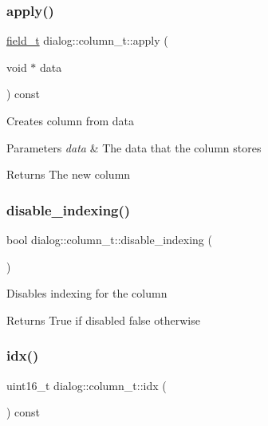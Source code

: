 \subsubsection{\texorpdfstring{apply()}{apply()}}
{\footnotesize\ttfamily \hyperlink{structdialog_1_1field__t}{field\+\_\+t} dialog\+::column\+\_\+t\+::apply (\begin{DoxyParamCaption}\item[{void $\ast$}]{data }\end{DoxyParamCaption}) const\hspace{0.3cm}{\ttfamily [inline]}}

Creates column from data 
\begin{DoxyParams}{Parameters}
{\em data} & The data that the column stores \\
\hline
\end{DoxyParams}
\begin{DoxyReturn}{Returns}
The new column 
\end{DoxyReturn}
\mbox{\label{classdialog_1_1column__t_ad9c14144d0ca7ae53f84f9c7fe222db9}} 
\subsubsection{\texorpdfstring{disable\+\_\+indexing()}{disable\_indexing()}}
{\footnotesize\ttfamily bool dialog\+::column\+\_\+t\+::disable\+\_\+indexing (\begin{DoxyParamCaption}{ }\end{DoxyParamCaption})\hspace{0.3cm}{\ttfamily [inline]}}

Disables indexing for the column \begin{DoxyReturn}{Returns}
True if disabled false otherwise 
\end{DoxyReturn}
\mbox{\label{classdialog_1_1column__t_aca785728bbaaced685cd2e0d6a027173}} 
\subsubsection{\texorpdfstring{idx()}{idx()}}
{\footnotesize\ttfamily uint16\+\_\+t dialog\+::column\+\_\+t\+::idx (\begin{DoxyParamCaption}{ }\end{DoxyParamCaption}) const\hspace{0.3cm}{\ttfamily [inline]}}

